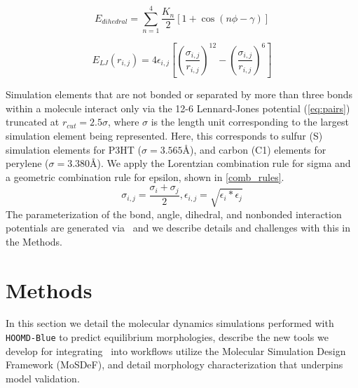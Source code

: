 \begin{equation}
    E_{dihedral} = \sum_{n=1}^{4}\frac{K_{n}}{2}[1+\cos{(n\phi-\gamma)}]
\label{eq:dihedrals}
\end{equation}

\begin{equation}
    E_{LJ}(r_{i,j}) = 4\epsilon_{i,j} \left[ \left({\frac{\sigma_{i,j}}{r_{i,j}}}\right)^{12} - \left({\frac{\sigma_{i,j}}{r_{i,j}}}\right)^{6} \right] %
    \label{eq:pairs}
\end{equation}

Simulation elements that are not bonded or separated by more than three bonds within a molecule interact only via the 12-6 Lennard-Jones potential (\autoref{eq:pairs}) \cite{lennard-jones_electronic_1929} truncated at $r_{cut}=2.5\sigma$, where $\sigma$ is the length unit corresponding to the largest simulation element being represented.
Here, this corresponds to sulfur (S) simulation elements for P3HT ($\sigma=3.565$\AA), and carbon (C1) elements for perylene ($\sigma=3.380$\AA).
We apply the Lorentzian combination rule for sigma and a geometric combination rule for epsilon, shown in \autoref{comb_rules}. 
\begin{equation}
    \sigma_{i,j} = \frac{\sigma_{i} + \sigma_{j}}{2}  ,   \epsilon_{i,j} = \sqrt{\epsilon_{i} * \epsilon_{j}}
    \label{comb_rules}
\end{equation}
The parameterization of the bond, angle, dihedral, and nonbonded interaction potentials are generated via \esp~and we describe details and challenges with this in the Methods.


\section{Methods}
In this section we detail the molecular dynamics simulations performed with \texttt{HOOMD-Blue}\cite{anderson_hoomd-blue_2020} to predict equilibrium morphologies, describe the new tools we develop for integrating \esp~into workflows utilize the Molecular Simulation Design Framework (MoSDeF)\cite{cummings2021open}, and detail morphology characterization that underpins model validation.

